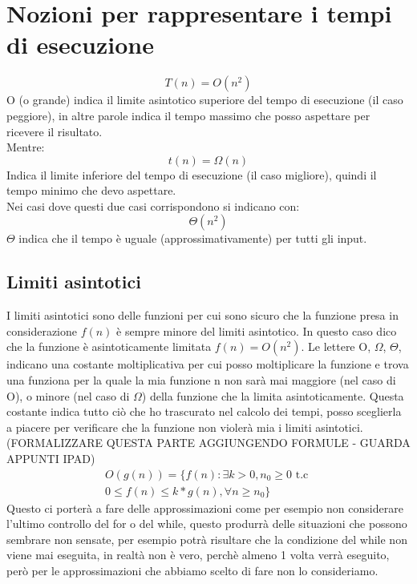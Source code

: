 \section{Nozioni per rappresentare i tempi di esecuzione}
\begin{equation*}
    T(n) = O(n^2)
\end{equation*}
O (o grande) indica il limite asintotico superiore del tempo di esecuzione (il caso peggiore),
in altre parole indica il tempo massimo che posso aspettare per ricevere il risultato.\\
Mentre:
\begin{equation*}
    t(n) = \Omega(n)
\end{equation*}
Indica il limite inferiore del tempo di esecuzione (il caso migliore), quindi il tempo
minimo che devo aspettare.\\
Nei casi dove questi due casi corrispondono si indicano con:
\begin{equation*}
    \Theta(n^2)
\end{equation*}
$\Theta$ indica che il tempo è uguale (approssimativamente) per tutti gli input.
\subsection{Limiti asintotici}
I limiti asintotici sono delle funzioni per cui sono sicuro che la funzione presa in
considerazione $f(n)$ è sempre minore del limiti asintotico. In questo caso
dico che la funzione è asintoticamente limitata $f(n) = O(n^2)$.
Le lettere O, $\Omega$, $\Theta$, indicano una costante moltiplicativa per cui posso
moltiplicare la funzione e trova una funziona per la quale la mia funzione n non sarà
mai maggiore (nel caso di O), o minore (nel caso di $\Omega$) della funzione che la limita
asintoticamente. Questa costante indica tutto ciò che ho trascurato nel calcolo dei tempi, 
posso sceglierla a piacere per verificare che la funzione non violerà mia i limiti
asintotici. (FORMALIZZARE QUESTA PARTE AGGIUNGENDO FORMULE - GUARDA APPUNTI IPAD)
\begin{align*}
    O(g(n)) = \{f(n):\exists k>0, n_0 \geq 0 \,\, \text{t.c}\,\, \\
    0 \leq f(n) \leq k*g(n), \forall n \geq n_0 \}
\end{align*}
Questo ci porterà a fare delle approssimazioni come per esempio non considerare
l'ultimo controllo del for o del while, questo produrrà delle situazioni che possono
sembrare non sensate, per esempio potrà risultare che la condizione del while non viene mai
eseguita, in realtà non è vero, perchè almeno 1 volta verrà eseguito, però per le approssimazioni
che abbiamo scelto di fare non lo consideriamo.
